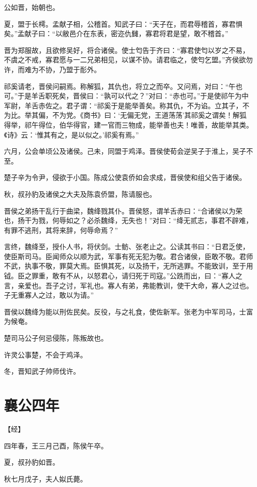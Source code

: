 \documentclass[a4paper,12pt,UTF8,twoside]{ctexbook}
\begin{document}
公如晋，始朝也。

夏，盟于长樗。孟献子相，公稽首。知武子曰：“天子在，而君辱稽首，寡君惧矣。”孟献子曰：“以敝邑介在东表，密迩仇雠，寡君将君是望，敢不稽首。”

晋为郑服故，且欲修吴好，将合诸侯。使士匄告于齐曰：“寡君使匄以岁之不易，不虞之不戒，寡君愿与一二兄弟相见，以谋不协。请君临之，使匄乞盟。”齐侯欲勿许，而难为不协，乃盟于耏外。

祁奚请老，晋侯问嗣焉。称解狐，其仇也，将立之而卒。又问焉，对曰：“午也可。”于是羊舌职死矣，晋侯曰：“孰可以代之？”对曰：“赤也可。”于是使祁午为中军尉，羊舌赤佐之。君子谓：“祁奚于是能举善矣。称其仇，不为谄。立其子，不为比。举其偏，不为党。《商书》曰：‘无偏无党，王道荡荡’其祁奚之谓矣！解狐得举，祁午得位，伯华得官，建一官而三物成，能举善也夫！唯善，故能举其类。《诗》云：‘惟其有之，是以似之。’祁奚有焉。”

六月，公会单顷公及诸侯。己未，同盟于鸡泽。晋侯使荀会逆吴子于淮上，吴子不至。

楚子辛为令尹，侵欲于小国。陈成公使袁侨如会求成，晋侯使和组父告于诸侯。

秋，叔孙豹及诸侯之大夫及陈袁侨盟，陈请服也。

晋侯之弟扬干乱行于曲梁，魏绛戮其仆。晋侯怒，谓羊舌赤曰：“合诸侯以为荣也，扬干为戮，何辱如之？必杀魏绛，无失也！”对曰：“绛无贰志，事君不辟难，有罪不逃刑，其将来辞，何辱命焉？”

言终，魏绛至，授仆人书，将伏剑。士鲂、张老止之。公读其书曰：“日君乏使，使臣斯司马。臣闻师众以顺为武，军事有死无犯为敬。君合诸侯，臣敢不敬。君师不武，执事不敬，罪莫大焉。臣惧其死，以及扬干，无所逃罪。不能致训，至于用钺。臣之罪重，敢有不从，以怒君心，请归死于司寇。”公跣而出，曰：“寡人之言，亲爱也。吾子之讨，军礼也。寡人有弟，弗能教训，使干大命，寡人之过也。子无重寡人之过，敢以为请。”

晋侯以魏绛为能以刑佐民矣。反役，与之礼食，使佐新军。张老为中军司马，士富为候奄。

楚司马公子何忌侵陈，陈叛故也。

许灵公事楚，不会于鸡泽。

冬，晋知武子帅师伐许。


\chapter{襄公四年}


【经】

四年春，王三月己酉，陈侯午卒。

夏，叔孙豹如晋。

秋七月戊子，夫人姒氏薨。
\end{document}

